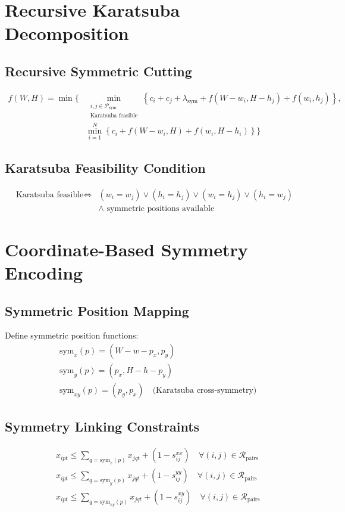 \documentclass{article}
\begin{document}
\section{Recursive Karatsuba Decomposition}

\subsection{Recursive Symmetric Cutting}
\begin{align}
f(W,H) = \min \Bigg\{ & \min_{\substack{i,j \in \mathcal{P}_{\text{sym}} \\ \text{Karatsuba feasible}}} \left\{ c_i + c_j + \lambda_{\text{sym}} + f(W-w_i, H-h_j) + f(w_i, h_j) \right\}, \\
& \min_{i=1}^{N} \left\{ c_i + f(W-w_i, H) + f(w_i, H-h_i) \right\} \Bigg\}
\end{align}

\subsection{Karatsuba Feasibility Condition}
\begin{align}
\text{Karatsuba feasible} \iff & (w_i = w_j) \lor (h_i = h_j) \lor (w_i = h_j) \lor (h_i = w_j) \\
& \land \text{ symmetric positions available}
\end{align}

\section{Coordinate-Based Symmetry Encoding}

\subsection{Symmetric Position Mapping}
Define symmetric position functions:
\begin{align}
& \text{sym}_x(p) = (W - w - p_x, p_y) \\
& \text{sym}_y(p) = (p_x, H - h - p_y) \\
& \text{sym}_{xy}(p) = (p_y, p_x) \quad \text{(Karatsuba cross-symmetry)}
\end{align}

\subsection{Symmetry Linking Constraints}
\begin{align}
& x_{ipt} \leq \sum_{q = \text{sym}_x(p)} x_{jqt} + (1 - s_{ij}^{xx}) \quad \forall (i,j) \in \mathcal{R}_{\text{pairs}} \\
& x_{ipt} \leq \sum_{q = \text{sym}_y(p)} x_{jqt} + (1 - s_{ij}^{yy}) \quad \forall (i,j) \in \mathcal{R}_{\text{pairs}} \\
& x_{ipt} \leq \sum_{q = \text{sym}_{xy}(p)} x_{jqt} + (1 - s_{ij}^{xy}) \quad \forall (i,j) \in \mathcal{R}_{\text{pairs}}
\end{align}
\end{document}
